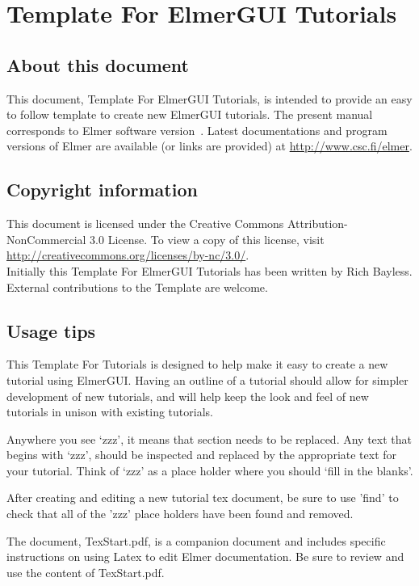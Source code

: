 \chapter*{Template For ElmerGUI Tutorials}

\section*{About this document}

This document, Template For ElmerGUI Tutorials, is intended to provide an easy to follow template to create new ElmerGUI tutorials.  The present manual corresponds to Elmer software version~\elmerversion{}.  Latest documentations and program versions of Elmer are available (or links are provided) at \url{http://www.csc.fi/elmer}. 

\section*{Copyright information}

This document is licensed under the Creative Commons Attribution-NonCommercial 3.0 License.  To view a copy of this license, visit \url{http://creativecommons.org/licenses/by-nc/3.0/}.\\

Initially this Template For ElmerGUI Tutorials has been written by Rich Bayless.  External contributions to the Template are welcome.

\section*{Usage tips}

This Template For Tutorials is designed to help make it easy to create a new tutorial using ElmerGUI.  Having an outline of a tutorial should allow for simpler development of new tutorials, and will help keep the look and feel of new tutorials in unison with existing tutorials.

Anywhere you see `zzz', it means that section needs to be replaced.  Any text that begins with `zzz', should be inspected and replaced by the appropriate text for your tutorial.  Think of `zzz' as a place holder where you should `fill in the blanks'.

After creating and editing a new tutorial tex document, be sure to use 'find' to check that all of the 'zzz' place holders have been found and removed.

The document, TexStart.pdf, is a companion document and includes specific instructions on using Latex to edit Elmer documentation.  Be sure to review and use the content of TexStart.pdf.\\

